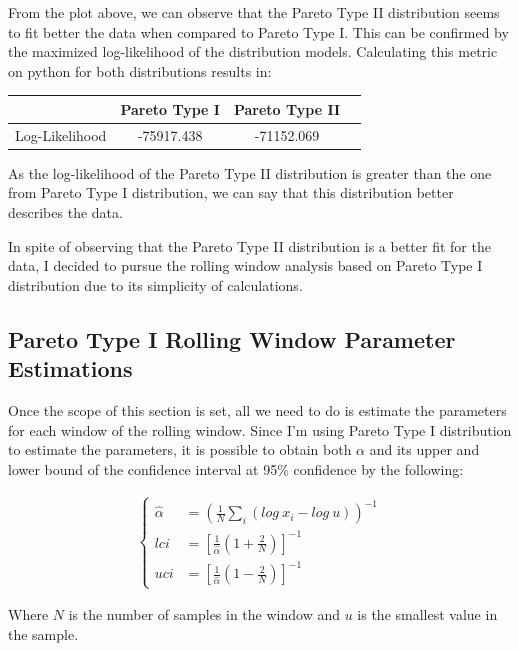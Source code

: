 \documentclass[paper=a4, fontsize=11pt]{scrartcl} %
\begin{document}
From the plot above, we can observe that the Pareto Type II distribution seems to fit better the data when compared to Pareto Type I. This can be confirmed by the maximized log-likelihood of the distribution models. Calculating this metric on python for both distributions results in:

\begin{center}
    \begin{tabular}{ |c|c|c|c| } 
        \hline
            & Pareto Type I & Pareto Type II \\
        \hline
            Log-Likelihood & -75917.438 & -71152.069 \\
        \hline
    \end{tabular}
\end{center}

As the log-likelihood of the Pareto Type II distribution is greater than the one from Pareto Type I distribution, we can say that this distribution better describes the data.

In spite of observing that the Pareto Type II distribution is a better fit for the data, I decided to pursue the rolling window analysis based on Pareto Type I distribution due to its simplicity of calculations.

\subsection{Pareto Type I Rolling Window Parameter Estimations}

Once the scope of this section is set, all we need to do is estimate the parameters for each window of the rolling window. Since I'm using Pareto Type I distribution to estimate the parameters, it is possible to obtain both $\alpha$ and its upper and lower bound of the confidence interval at 95\% confidence by the following:

\begin{align*}
    \begin{cases}
        \hat{\alpha} & = \left( \frac{1}{N} \sum_{i} (log \ x_i - log \ u) \right)^{-1} \\
        lci & = \left[ \frac{1}{\hat{\alpha}} \left(1 +\frac{2}{N} \right) \right]^{-1} \\
        uci & = \left[ \frac{1}{\hat{\alpha}} \left(1 -\frac{2}{N} \right) \right]^{-1}
    \end{cases}
\end{align*}

Where $N$ is the number of samples in the window and $u$ is the smallest value in the sample.
\end{document}

